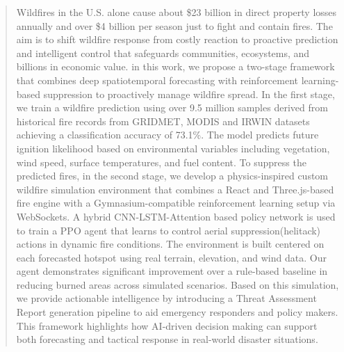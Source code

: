 \documentclass[conference]{IEEEtran}
\begin{document}
\begin{abstract}
Wildfires in the U.S. alone cause about \$23 billion in direct property losses annually and over \$4 billion per season just to fight and contain fires. The aim is to shift wildfire response from costly reaction to proactive prediction and intelligent control that safeguards communities, ecosystems, and billions in economic value.
in this work, we propose a two-stage framework that combines deep spatiotemporal forecasting with reinforcement learning-based suppression to proactively manage wildfire spread. In the first stage, we train a wildfire prediction using over 9.5 million samples derived from historical fire records from GRIDMET, MODIS and IRWIN datasets achieving a classification accuracy of 73.1\%. The model predicts future ignition likelihood based on environmental variables including vegetation, wind speed, surface temperatures, and fuel content.
To suppress the predicted fires, in the second stage, we develop a physics-inspired custom wildfire simulation environment that combines a React and Three.js-based fire engine with a Gymnasium-compatible reinforcement learning setup via WebSockets. A hybrid CNN-LSTM-Attention based policy network is used to train a PPO agent that learns to control aerial suppression(helitack) actions in dynamic fire conditions. The environment is built centered on each forecasted hotspot using real terrain, elevation, and wind data.
Our agent demonstrates significant improvement over a rule-based baseline in reducing burned areas across simulated scenarios.
Based on this simulation, we provide actionable intelligence  by introducing a Threat Assessment Report generation pipeline to aid emergency responders and policy makers.
This framework highlights how AI-driven decision making can support both forecasting and tactical response in real-world disaster situations.\\
\end{abstract}
\end{document}

